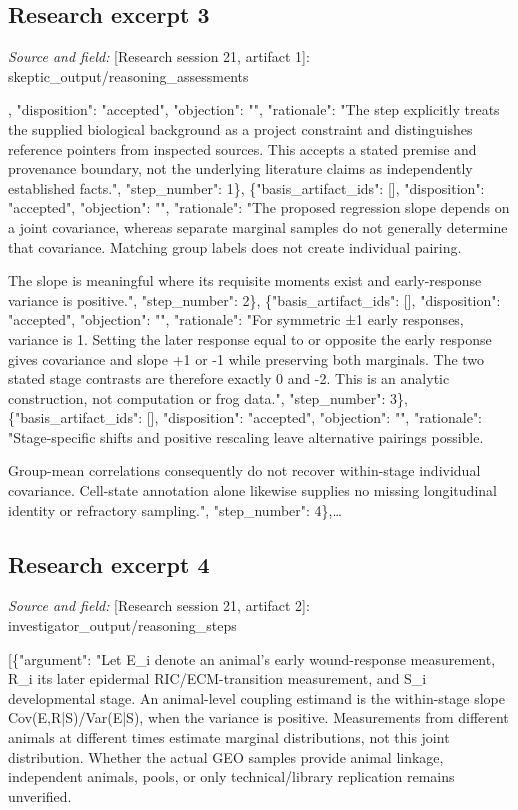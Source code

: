\documentclass[11pt]{article}
\begin{document}
\subsection{Research excerpt 3}
\textit{Source and field: }[Research session 21, artifact 1]: skeptic\_output/reasoning\_assessments\par
[\{"basis\_artifact\_ids": [], "disposition": "accepted", "objection": "", "rationale": "The step explicitly treats the supplied biological background as a project constraint and distinguishes reference pointers from inspected sources. This accepts a stated premise and provenance boundary, not the underlying literature claims as independently established facts.", "step\_number": 1\}, \{"basis\_artifact\_ids": [], "disposition": "accepted", "objection": "", "rationale": "The proposed regression slope depends on a joint covariance, whereas separate marginal samples do not generally determine that covariance. Matching group labels does not create individual pairing.

The slope is meaningful where its requisite moments exist and early-response variance is positive.", "step\_number": 2\}, \{"basis\_artifact\_ids": [], "disposition": "accepted", "objection": "", "rationale": "For symmetric ±1 early responses, variance is 1. Setting the later response equal to or opposite the early response gives covariance and slope +1 or -1 while preserving both marginals. The two stated stage contrasts are therefore exactly 0 and -2. This is an analytic construction, not computation or frog data.", "step\_number": 3\}, \{"basis\_artifact\_ids": [], "disposition": "accepted", "objection": "", "rationale": "Stage-specific shifts and positive rescaling leave alternative pairings possible.

Group-mean correlations consequently do not recover within-stage individual covariance. Cell-state annotation alone likewise supplies no missing longitudinal identity or refractory sampling.", "step\_number": 4\},\ldots{}

\subsection{Research excerpt 4}
\textit{Source and field: }[Research session 21, artifact 2]: investigator\_output/reasoning\_steps\par
[\{"argument": "Let E\_i denote an animal's early wound-response measurement, R\_i its later epidermal RIC/ECM-transition measurement, and S\_i developmental stage. An animal-level coupling estimand is the within-stage slope Cov(E,R|S)/Var(E|S), when the variance is positive. Measurements from different animals at different times estimate marginal distributions, not this joint distribution. Whether the actual GEO samples provide animal linkage, independent animals, pools, or only technical/library replication remains unverified.
\end{document}
